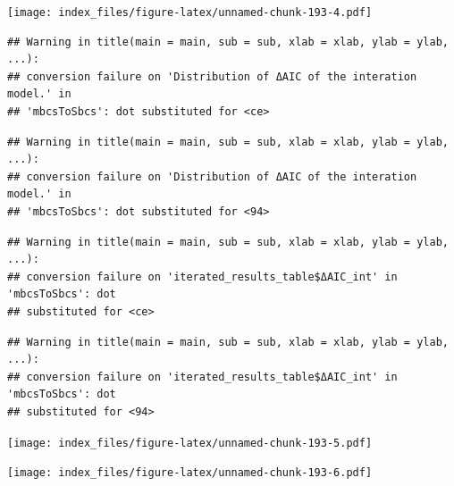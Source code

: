 \documentclass[
]{article}
\newenvironment{Shaded}{\begin{snugshade}}{\end{snugshade}}
\newcommand{\AttributeTok}[1]{\textcolor[rgb]{0.77,0.63,0.00}{#1}}
\newcommand{\FunctionTok}[1]{\textcolor[rgb]{0.00,0.00,0.00}{#1}}
\newcommand{\NormalTok}[1]{#1}
\newcommand{\SpecialCharTok}[1]{\textcolor[rgb]{0.00,0.00,0.00}{#1}}
\newcommand{\StringTok}[1]{\textcolor[rgb]{0.31,0.60,0.02}{#1}}
\begin{document}
\texttt{[image: index\_files/figure-latex/unnamed-chunk-193-4.pdf]}

\begin{Shaded}
\end{Shaded}

\begin{verbatim}
## Warning in title(main = main, sub = sub, xlab = xlab, ylab = ylab, ...):
## conversion failure on 'Distribution of ΔAIC of the interation model.' in
## 'mbcsToSbcs': dot substituted for <ce>
\end{verbatim}

\begin{verbatim}
## Warning in title(main = main, sub = sub, xlab = xlab, ylab = ylab, ...):
## conversion failure on 'Distribution of ΔAIC of the interation model.' in
## 'mbcsToSbcs': dot substituted for <94>
\end{verbatim}

\begin{verbatim}
## Warning in title(main = main, sub = sub, xlab = xlab, ylab = ylab, ...):
## conversion failure on 'iterated_results_table$ΔAIC_int' in 'mbcsToSbcs': dot
## substituted for <ce>
\end{verbatim}

\begin{verbatim}
## Warning in title(main = main, sub = sub, xlab = xlab, ylab = ylab, ...):
## conversion failure on 'iterated_results_table$ΔAIC_int' in 'mbcsToSbcs': dot
## substituted for <94>
\end{verbatim}

\texttt{[image: index\_files/figure-latex/unnamed-chunk-193-5.pdf]}

\begin{Shaded}
\end{Shaded}

\texttt{[image: index\_files/figure-latex/unnamed-chunk-193-6.pdf]}
\end{document}
